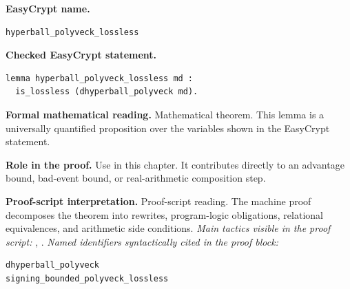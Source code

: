 \begin{formaltheorem}
\noindent\textbf{EasyCrypt name.}
\begin{lstlisting}[language=EasyCrypt,basicstyle=\ttfamily\scriptsize]
hyperball_polyveck_lossless
\end{lstlisting}
\noindent\textbf{Checked EasyCrypt statement.}
\begin{lstlisting}[language=EasyCrypt,basicstyle=\ttfamily\scriptsize]
lemma hyperball_polyveck_lossless md :
  is_lossless (dhyperball_polyveck md).
\end{lstlisting}
\noindent\textbf{Formal mathematical reading.}
Mathematical theorem. This lemma is a universally quantified proposition over the variables shown in the EasyCrypt statement.

\noindent\textbf{Role in the proof.}
Use in this chapter. It contributes directly to an advantage bound, bad-event bound, or real-arithmetic composition step.

\noindent\textbf{Proof-script interpretation.}
Proof-script reading. The machine proof decomposes the theorem into rewrites, program-logic obligations, relational equivalences, and arithmetic side conditions.
\emph{Main tactics visible in the proof script:} , .
\emph{Named identifiers syntactically cited in the proof block:}
\begin{lstlisting}[language=EasyCrypt,basicstyle=\ttfamily\scriptsize]
dhyperball_polyveck
signing_bounded_polyveck_lossless
\end{lstlisting}

\end{formaltheorem}

